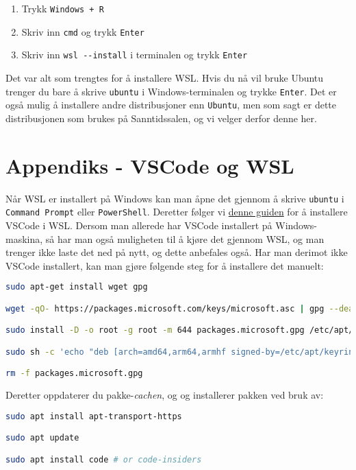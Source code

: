 \begin{enumerate}
    \item Trykk \verb|Windows + R|
    \item Skriv inn \verb|cmd| og trykk \verb|Enter|
    \item Skriv inn \verb|wsl --install| i terminalen og trykk \verb|Enter|
\end{enumerate}

Det var alt som trengtes for å installere WSL. Hvis du nå vil bruke Ubuntu trenger du bare å skrive \verb|ubuntu| i Windows-terminalen og trykke \verb|Enter|. Det er også mulig å installere andre distribusjoner enn \verb|Ubuntu|, men som sagt er dette distribusjonen som brukes på Sanntidssalen, og vi velger derfor denne her.

\section{Appendiks - VSCode og WSL}\label{app:wsl+vscode}
Når WSL er installert på Windows kan man åpne det gjennom å skrive \verb|ubuntu| i \verb|Command Prompt| eller \verb|PowerShell|. Deretter følger vi \href{https://code.visualstudio.com/docs/setup/linux}{denne guiden} for å installere VSCode i WSL. Dersom man allerede har VSCode installert på Windows-maskina, så har man også muligheten til å kjøre det gjennom WSL, og man trenger ikke laste det ned på nytt, og dette anbefales også. Har man derimot ikke VSCode installert, kan man gjøre følgende steg for å installere det manuelt:

\begin{lstlisting}[language=bash]
sudo apt-get install wget gpg

wget -qO- https://packages.microsoft.com/keys/microsoft.asc | gpg --dearmor > packages.microsoft.gpg

sudo install -D -o root -g root -m 644 packages.microsoft.gpg /etc/apt/keyrings/packages.microsoft.gpg

sudo sh -c 'echo "deb [arch=amd64,arm64,armhf signed-by=/etc/apt/keyrings/packages.microsoft.gpg] https://packages.microsoft.com/repos/code stable main" > /etc/apt/sources.list.d/vscode.list'

rm -f packages.microsoft.gpg
\end{lstlisting}

Deretter oppdaterer du pakke-\textit{cachen}, og og installerer pakken ved bruk av:

\begin{lstlisting}[language=bash]
sudo apt install apt-transport-https

sudo apt update

sudo apt install code # or code-insiders
\end{lstlisting}

